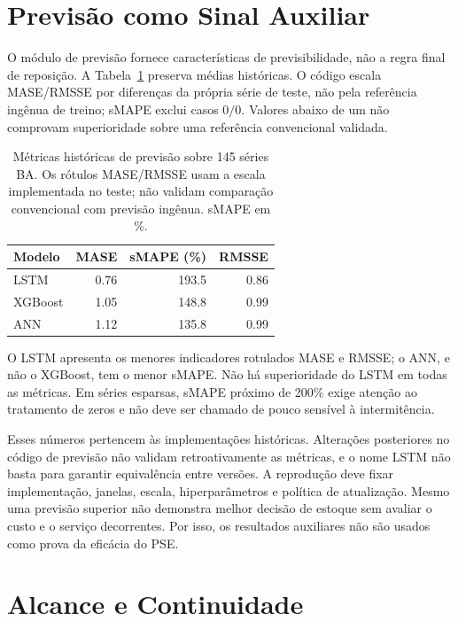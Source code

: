 \section{Previsão como Sinal Auxiliar}

O módulo de previsão fornece características de previsibilidade, não a regra final de reposição. A Tabela~\ref{tab:forecast_metrics} preserva médias históricas. O código escala MASE/RMSSE por diferenças da própria série de teste, não pela referência ingênua de treino; sMAPE exclui casos $0/0$. Valores abaixo de um não comprovam superioridade sobre uma referência convencional validada.

\begin{table}[ht]
\centering
\small
\caption{Métricas históricas de previsão sobre 145 séries BA. Os rótulos MASE/RMSSE usam a escala implementada no teste; não validam comparação convencional com previsão ingênua. sMAPE em \%.}
\label{tab:forecast_metrics}
\begin{tabular}{@{}lrrr@{}}
\toprule
Modelo   & MASE & sMAPE (\%) & RMSSE \\
\midrule
LSTM     & 0.76 & 193.5 & 0.86 \\
XGBoost  & 1.05 & 148.8 & 0.99 \\
ANN      & 1.12 & 135.8 & 0.99 \\
\bottomrule
\end{tabular}
\end{table}

O LSTM apresenta os menores indicadores rotulados MASE e RMSSE; o ANN, e não o XGBoost, tem o menor sMAPE. Não há superioridade do LSTM em todas as métricas. Em séries esparsas, sMAPE próximo de 200\% exige atenção ao tratamento de zeros e não deve ser chamado de pouco sensível à intermitência.

Esses números pertencem às implementações históricas. Alterações posteriores no código de previsão não validam retroativamente as métricas, e o nome LSTM não basta para garantir equivalência entre versões. A reprodução deve fixar implementação, janelas, escala, hiperparâmetros e política de atualização. Mesmo uma previsão superior não demonstra melhor decisão de estoque sem avaliar o custo e o serviço decorrentes. Por isso, os resultados auxiliares não são usados como prova da eficácia do PSE.

\section{Alcance e Continuidade}
\label{sec:threats}

